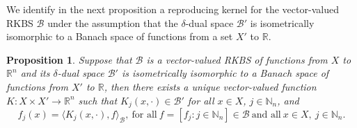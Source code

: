 \documentclass[11pt]{article}
\newtheorem{proposition}[theorem]{Proposition}
\begin{document}
We identify in the next proposition a reproducing kernel for the vector-valued RKBS $\mathcal{B}$ under the assumption that the $\delta$-dual space $\mathcal{B}'$ is isometrically isomorphic to a Banach space of functions from a set $X'$ to $\mathbb{R}$. 
%
%
%
%

\begin{proposition}\label{existence of reproducing kernel}
Suppose that $\mathcal{B}$ is a vector-valued RKBS of functions from $X$ to $\mathbb{R}^n$ and its $\delta$-dual space $\mathcal{B}'$ is isometrically isomorphic to a Banach space of functions from $X'$ to $\mathbb{R}$, then there exists a unique vector-valued function $K:X\times X'\to\mathbb{R}^n$ such that $K_j(x,\cdot)\in \mathcal{B}'$ for all $x\in X$, $j\in\mathbb{N}_n$, and
\begin{equation}\label{def: reproducing property}
    f_j(x)=\langle K_j(x,\cdot),f\rangle_{\mathcal{B}},\ \mbox{for all}\ f=[f_j:j\in\mathbb{N}_n]\in\mathcal{B} \ \mbox{and all}\  x\in X, \ j\in\mathbb{N}_n.
\end{equation}
\end{proposition}
\end{document}
